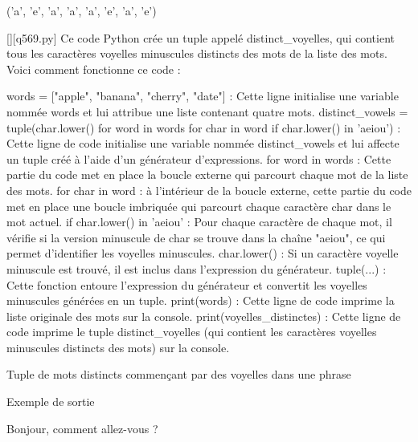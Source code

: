 ('a', 'e', 'a', 'a', 'a', 'e', 'a', 'e')
        \par
        \begin{solution}
            \renewcommand{\nomfichier}{q569.py}
            \pythonfile{\chemincode \nomfichier}[][\nomfichier]
            Ce code Python crée un tuple appelé distinct\_voyelles, qui contient tous les caractères voyelles minuscules distincts des mots de la liste des mots. Voici comment fonctionne ce code :

    words = ["apple", "banana", "cherry", "date"] : Cette ligne initialise une variable nommée words et lui attribue une liste contenant quatre mots.
    distinct\_vowels = tuple(char.lower() for word in words for char in word if char.lower() in 'aeiou') : Cette ligne de code initialise une variable nommée distinct\_vowels et lui affecte un tuple créé à l'aide d'un générateur d'expressions.
        for word in words : Cette partie du code met en place la boucle externe qui parcourt chaque mot de la liste des mots.
        for char in word : à l'intérieur de la boucle externe, cette partie du code met en place une boucle imbriquée qui parcourt chaque caractère char dans le mot actuel.
        if char.lower() in 'aeiou' : Pour chaque caractère de chaque mot, il vérifie si la version minuscule de char se trouve dans la chaîne "aeiou", ce qui permet d'identifier les voyelles minuscules.
        char.lower() : Si un caractère voyelle minuscule est trouvé, il est inclus dans l'expression du générateur.
        tuple(...) : Cette fonction entoure l'expression du générateur et convertit les voyelles minuscules générées en un tuple.
    print(words) : Cette ligne de code imprime la liste originale des mots sur la console.
    print(voyelles\_distinctes) : Cette ligne de code imprime le tuple distinct\_voyelles (qui contient les caractères voyelles minuscules distincts des mots) sur la console.
        \end{solution}
        

        \question
        Tuple de mots distincts commençant par des voyelles dans une phrase

Exemple de sortie

Bonjour, comment allez-vous ?

